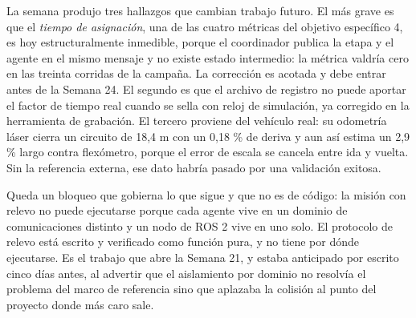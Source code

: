 \documentclass[12pt,letterpaper]{article}
\begin{document}
La semana produjo tres hallazgos que cambian trabajo futuro. El más grave es que el \emph{tiempo de asignación}, una de las cuatro métricas del objetivo específico 4, es hoy estructuralmente inmedible, porque el coordinador publica la etapa y el agente en el mismo mensaje y no existe estado intermedio: la métrica valdría cero en las treinta corridas de la campaña. La corrección es acotada y debe entrar antes de la Semana 24. El segundo es que el archivo de registro no puede aportar el factor de tiempo real cuando se sella con reloj de simulación, ya corregido en la herramienta de grabación. El tercero proviene del vehículo real: su odometría láser cierra un circuito de 18,4 m con un 0,18 \% de deriva y aun así estima un 2,9 \% largo contra flexómetro, porque el error de escala se cancela entre ida y vuelta. Sin la referencia externa, ese dato habría pasado por una validación exitosa.

Queda un bloqueo que gobierna lo que sigue y que no es de código: la misión con relevo no puede ejecutarse porque cada agente vive en un dominio de comunicaciones distinto y un nodo de ROS 2 vive en uno solo. El protocolo de relevo está escrito y verificado como función pura, y no tiene por dónde ejecutarse. Es el trabajo que abre la Semana 21, y estaba anticipado por escrito cinco días antes, al advertir que el aislamiento por dominio no resolvía el problema del marco de referencia sino que aplazaba la colisión al punto del proyecto donde más caro sale.
\end{document}
